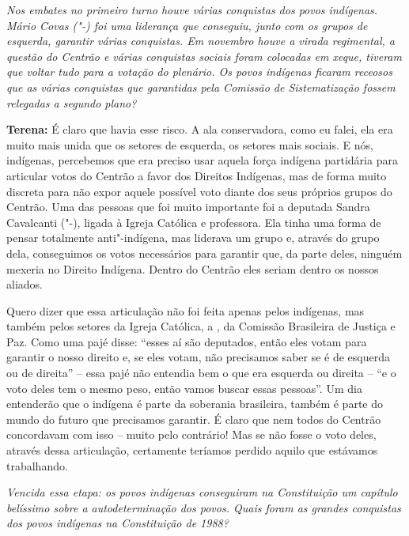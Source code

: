 \emph{Nos embates no primeiro turno houve várias conquistas dos povos
indígenas. Mário Covas ("-) foi uma liderança que conseguiu, junto
com os grupos de esquerda, garantir várias conquistas. Em novembro houve
a virada regimental, a questão do Centrão e várias conquistas sociais
foram colocadas em xeque, tiveram que voltar tudo para a votação do
plenário. Os povos indígenas ficaram receosos que as várias conquistas
que garantidas pela Comissão de Sistematização fossem relegadas a
segundo plano?}

\textbf{Terena:} É claro que havia esse risco. A ala conservadora, como
eu falei, ela era muito mais unida que os setores de esquerda, os
setores mais sociais. E nós, indígenas, percebemos que era preciso usar
aquela força indígena partidária para articular votos do Centrão a favor
dos Direitos Indígenas, mas de forma muito discreta para não expor
aquele possível voto diante dos seus próprios grupos do Centrão. Uma das
pessoas que foi muito importante foi a deputada Sandra Cavalcanti
("-), ligada à Igreja Católica e professora. Ela tinha uma forma de
pensar totalmente anti"-indígena, mas liderava um grupo e, através do
grupo dela, conseguimos os votos necessários para garantir que, da parte
deles, ninguém mexeria no Direito Indígena. Dentro do Centrão eles
seriam dentro os nossos aliados.

Quero dizer que essa articulação não foi feita apenas pelos indígenas,
mas também pelos setores da Igreja Católica, a , da Comissão
Brasileira de Justiça e Paz. Como uma pajé disse: ``esses aí são
deputados, então eles votam para garantir o nosso direito e, se eles
votam, não precisamos saber se é de esquerda ou de direita'' -- essa
pajé não entendia bem o que era esquerda ou direita -- ``e o voto deles
tem o mesmo peso, então vamos buscar essas pessoas''. Um dia entenderão
que o indígena é parte da soberania brasileira, também é parte do mundo
do futuro que precisamos garantir. É claro que nem todos do Centrão
concordavam com isso -- muito pelo contrário! Mas se não fosse o voto
deles, através dessa articulação, certamente teríamos perdido aquilo que
estávamos trabalhando.

\emph{Vencida essa etapa: os povos indígenas conseguiram na
Constituição um capítulo belíssimo sobre a autodeterminação dos povos.
Quais foram as grandes conquistas dos povos indígenas na Constituição de
1988?}

